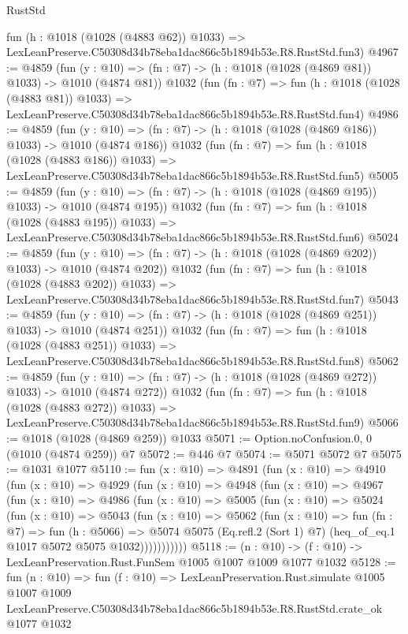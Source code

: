 \begin{lexlean}{RustStd}
\begin{coremodule}
    fun (h : @1018 (@1028 (@4883 @62)) @1033) =>
    LexLeanPreserve.C50308d34b78eba1dac866c5b1894b53e.R8.RustStd.fun3)
@4967 := @4859
    (fun (y : @10) => (fn : @7) -> (h : @1018 (@1028 (@4869 @81)) @1033) -> @1010 (@4874 @81))
    @1032
    (fun (fn : @7) =>
    fun (h : @1018 (@1028 (@4883 @81)) @1033) =>
    LexLeanPreserve.C50308d34b78eba1dac866c5b1894b53e.R8.RustStd.fun4)
@4986 := @4859
    (fun (y : @10) => (fn : @7) -> (h : @1018 (@1028 (@4869 @186)) @1033) -> @1010 (@4874 @186))
    @1032
    (fun (fn : @7) =>
    fun (h : @1018 (@1028 (@4883 @186)) @1033) =>
    LexLeanPreserve.C50308d34b78eba1dac866c5b1894b53e.R8.RustStd.fun5)
@5005 := @4859
    (fun (y : @10) => (fn : @7) -> (h : @1018 (@1028 (@4869 @195)) @1033) -> @1010 (@4874 @195))
    @1032
    (fun (fn : @7) =>
    fun (h : @1018 (@1028 (@4883 @195)) @1033) =>
    LexLeanPreserve.C50308d34b78eba1dac866c5b1894b53e.R8.RustStd.fun6)
@5024 := @4859
    (fun (y : @10) => (fn : @7) -> (h : @1018 (@1028 (@4869 @202)) @1033) -> @1010 (@4874 @202))
    @1032
    (fun (fn : @7) =>
    fun (h : @1018 (@1028 (@4883 @202)) @1033) =>
    LexLeanPreserve.C50308d34b78eba1dac866c5b1894b53e.R8.RustStd.fun7)
@5043 := @4859
    (fun (y : @10) => (fn : @7) -> (h : @1018 (@1028 (@4869 @251)) @1033) -> @1010 (@4874 @251))
    @1032
    (fun (fn : @7) =>
    fun (h : @1018 (@1028 (@4883 @251)) @1033) =>
    LexLeanPreserve.C50308d34b78eba1dac866c5b1894b53e.R8.RustStd.fun8)
@5062 := @4859
    (fun (y : @10) => (fn : @7) -> (h : @1018 (@1028 (@4869 @272)) @1033) -> @1010 (@4874 @272))
    @1032
    (fun (fn : @7) =>
    fun (h : @1018 (@1028 (@4883 @272)) @1033) =>
    LexLeanPreserve.C50308d34b78eba1dac866c5b1894b53e.R8.RustStd.fun9)
@5066 := @1018 (@1028 (@4869 @259)) @1033
@5071 := Option.noConfusion.{0, 0} (@1010 (@4874 @259)) @7
@5072 := @446 @7
@5074 := @5071 @5072 @7
@5075 := @1031 @1077
@5110 := fun (x : @10) =>
  @4891
    (fun (x : @10) =>
    @4910
      (fun (x : @10) =>
      @4929
        (fun (x : @10) =>
        @4948
          (fun (x : @10) =>
          @4967
            (fun (x : @10) =>
            @4986
              (fun (x : @10) =>
              @5005
                (fun (x : @10) =>
                @5024
                  (fun (x : @10) =>
                  @5043
                    (fun (x : @10) =>
                    @5062
                      (fun (x : @10) =>
                      fun (fn : @7) =>
                      fun (h : @5066) =>
                      @5074
                        @5075
                        (Eq.refl.{2} (Sort 1) @7)
                        (heq_of_eq.{1} @1017 @5072 @5075 @1032)))))))))))
@5118 := (n : @10) -> (f : @10) -> LexLeanPreservation.Rust.FunSem @1005 @1007 @1009 @1077 @1032
@5128 := fun (n : @10) =>
  fun (f : @10) =>
  LexLeanPreservation.Rust.simulate
    @1005
    @1007
    @1009
    LexLeanPreserve.C50308d34b78eba1dac866c5b1894b53e.R8.RustStd.crate_ok
    @1077
    @1032
\end{coremodule}
\end{lexlean}
